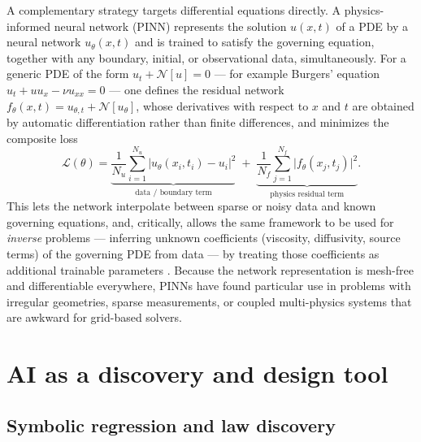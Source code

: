 \documentclass[11pt]{article}
\begin{document}
A complementary strategy targets differential equations directly. A physics-informed neural network (PINN) represents the solution $u(x,t)$ of a PDE by a neural network $u_\theta(x,t)$ and is trained to satisfy the governing equation, together with any boundary, initial, or observational data, simultaneously. For a generic PDE of the form $u_t + \mathcal{N}[u] = 0$ --- for example Burgers' equation $u_t + u u_x - \nu u_{xx} = 0$ --- one defines the residual network $f_\theta(x,t) = u_{\theta,t} + \mathcal{N}[u_\theta]$, whose derivatives with respect to $x$ and $t$ are obtained by automatic differentiation rather than finite differences, and minimizes the composite loss
\begin{equation}
\mathcal{L}(\theta) = \underbrace{\frac{1}{N_u}\sum_{i=1}^{N_u} \big|u_\theta(x_i,t_i) - u_i\big|^2}_{\text{data / boundary term}} \;+\; \underbrace{\frac{1}{N_f}\sum_{j=1}^{N_f} \big| f_\theta(x_j,t_j)\big|^2}_{\text{physics residual term}}.
\end{equation}
This lets the network interpolate between sparse or noisy data and known governing equations, and, critically, allows the same framework to be used for \emph{inverse} problems --- inferring unknown coefficients (viscosity, diffusivity, source terms) of the governing PDE from data --- by treating those coefficients as additional trainable parameters \cite{raissi2019}. Because the network representation is mesh-free and differentiable everywhere, PINNs have found particular use in problems with irregular geometries, sparse measurements, or coupled multi-physics systems that are awkward for grid-based solvers.

\section{AI as a discovery and design tool}
\label{sec:discovery}

\subsection{Symbolic regression and law discovery}
\end{document}
